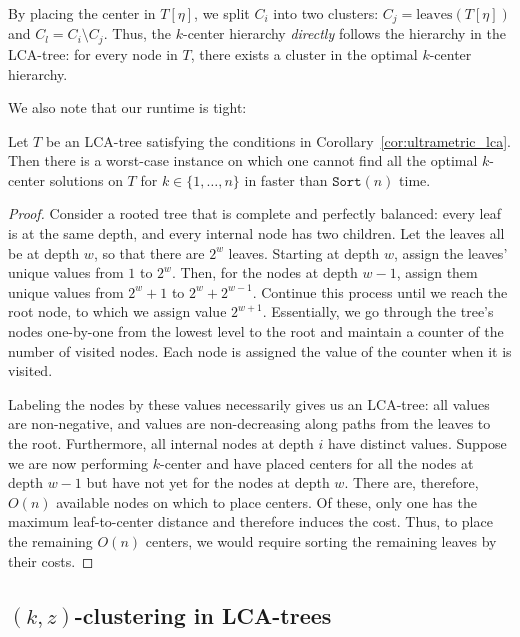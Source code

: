 By placing the center in $T[\eta]$, we split $C_i$ into two clusters: $C_j = \text{leaves}(T[\eta])$ and $C_l = C_i \setminus C_j$. Thus, the $k$-center hierarchy \emph{directly} follows the hierarchy in the LCA-tree: for every node in $T$, there exists a cluster in the optimal $k$-center hierarchy.

We also note that our runtime is tight: 

\begin{lemma}
    \label{lma:worst_case}
    Let $T$ be an LCA-tree satisfying the conditions in Corollary~\ref{cor:ultrametric_lca}. Then there is a worst-case instance on which one cannot find all the optimal $k$-center solutions on $T$ for $k \in \{1, \ldots, n\}$ in faster than $\texttt{Sort}(n)$ time.
\end{lemma}
\begin{proof}
    Consider a rooted tree that is complete and perfectly balanced: every leaf is at the same depth, and every internal node has two children. Let the leaves all be at depth $w$, so that there are $2^w$ leaves. Starting at depth $w$, assign the leaves' unique values from $1$ to $2^w$. Then, for the nodes at depth $w-1$, assign them unique values from $2^w+1$ to $2^w + 2^{w-1}$. Continue this process until we reach the root node, to which we assign value $2^{w+1}$. Essentially, we go through the tree's nodes one-by-one from the lowest level to the root and maintain a counter of the number of visited nodes. Each node is assigned the value of the counter when it is visited.

    Labeling the nodes by these values necessarily gives us an LCA-tree: all values are non-negative, and values are non-decreasing along paths from the leaves to the root. Furthermore, all internal nodes at depth $i$ have distinct values. Suppose we are now performing $k$-center and have placed centers for all the nodes at depth $w-1$ but have not yet for the nodes at depth $w$. There are, therefore, $O(n)$ available nodes on which to place centers. Of these, only one has the maximum leaf-to-center distance and therefore induces the cost. Thus, to place the remaining $O(n)$ centers, we would require sorting the remaining leaves by their costs.
\end{proof}

\subsection{$(k, z)$-clustering in LCA-trees}
\label{app:k_z_clustering_proof}

